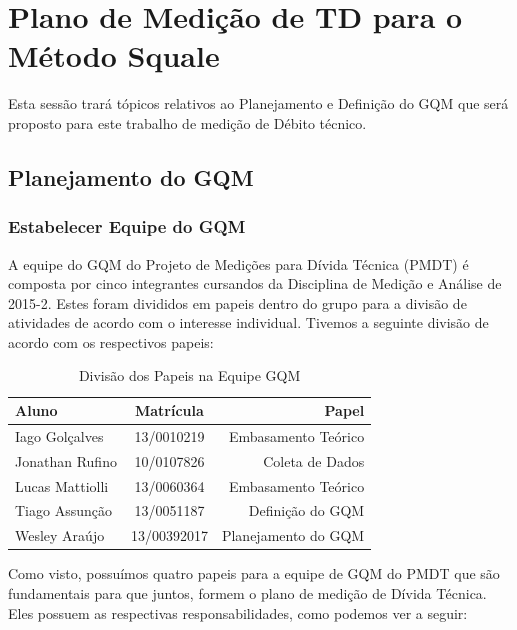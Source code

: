 \chapter[Plano de Medição de TD para o Método Squale]{Plano de Medição de TD para o Método Squale}

Esta sessão trará tópicos relativos ao Planejamento e Definição do GQM que será
proposto para este trabalho de medição de Débito técnico.

\section{Planejamento do GQM}
\subsection{Estabelecer Equipe do GQM}
A equipe do GQM do Projeto de Medições para Dívida Técnica (PMDT) é composta por
cinco integrantes cursandos da Disciplina de Medição e Análise de 2015-2. Estes
foram divididos em papeis dentro do grupo para a divisão de atividades de acordo
com o interesse individual. Tivemos a seguinte divisão de acordo com os respectivos
papeis:
\\


\begin{table}[ht]
\caption{Divisão dos Papeis na Equipe GQM}
\centering
\begin{tabular}{|l*{1}{c}r|}
\hline
Aluno              & Matrícula & Papel \\
\hline
Iago Golçalves & 13/0010219 &   Embasamento Teórico   \\
\hline
Jonathan  Rufino & 10/0107826 &   Coleta de Dados\\
\hline
Lucas Mattiolli & 13/0060364 &   Embasamento Teórico \\
\hline
Tiago Assunção & 13/0051187 &   Definição do GQM  \\
\hline
Wesley Araújo & 13/00392017 &   Planejamento do GQM \\
\hline
\end{tabular}
\label{table:papeisgqm}
\end{table}

Como visto, possuímos quatro papeis para a equipe de GQM do PMDT que são fundamentais
para que juntos, formem o plano de medição de Dívida Técnica. Eles possuem as respectivas
responsabilidades, como podemos ver a seguir:

